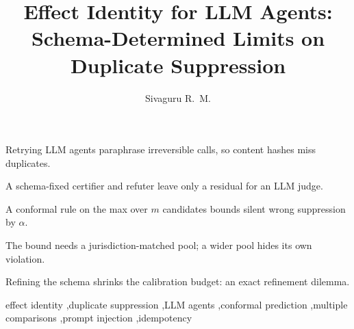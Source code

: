\documentclass[preprint,review,12pt]{elsarticle}
\theoremstyle{definition}
\theoremstyle{remark}
\begin{document}
\begin{frontmatter}
\title{Effect Identity for LLM Agents:\\ Schema-Determined Limits on Duplicate Suppression}

\author[aff1]{Sivaguru R.~M.}

\begin{abstract}

\end{abstract}

\begin{highlights}
\item Retrying LLM agents paraphrase irreversible calls, so content hashes miss duplicates.
\item A schema-fixed certifier and refuter leave only a residual for an LLM judge.
\item A conformal rule on the max over $m$ candidates bounds silent wrong suppression by $\alpha$.
\item The bound needs a jurisdiction-matched pool; a wider pool hides its own violation.
\item Refining the schema shrinks the calibration budget: an exact refinement dilemma.
\end{highlights}

\begin{keyword}
effect identity \sep duplicate suppression \sep LLM agents \sep conformal prediction \sep multiple comparisons \sep prompt injection \sep idempotency
\end{keyword}
\end{frontmatter}

\linenumbers
\sloppy
{}














\appendix




\end{document}
